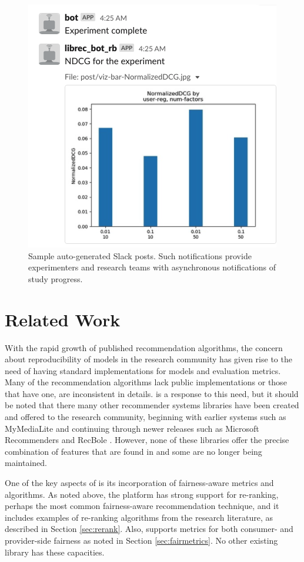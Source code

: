 \begin{figure}[ht!]
    \centering
    \includegraphics[width=0.8\linewidth]{figs/chapter6-librecauto/slack-post.png}
    \caption{Sample auto-generated Slack posts. Such notifications provide experimenters and research teams with asynchronous notifications of study progress.}
    \label{fig:slack}
    \vspace{-0.15in}
\end{figure}

\section{Related Work}

With the rapid growth of published recommendation algorithms, the concern about reproducibility of models in the research community has given rise to the need of having standard implementations for models and evaluation metrics. Many of the recommendation algorithms lack public implementations or those that have one, are inconsistent in details. \libauto{} is a response to this need, but it should be noted that there many other recommender systems libraries have been created and offered to the research community, beginning with earlier systems such as MyMediaLite \cite{MyMediaLite} and continuing through newer releases such as Microsoft Recommenders \cite{MicrosoftRecommenders} and RecBole \cite{recbole}. However, none of these libraries offer the precise combination of features that are found in \libauto{} and some are no longer being maintained.

One of the key aspects of \libauto{} is its incorporation of fairness-aware metrics and algorithms. As noted above, the platform has strong support for re-ranking, perhaps the most common fairness-aware recommendation technique, and it includes examples of re-ranking algorithms from the research literature, as described in Section \ref{sec:rerank}. Also, \libauto{} supports metrics for both consumer- and provider-side fairness as noted in Section \ref{sec:fairmetrics}. No other existing library has these capacities. 

